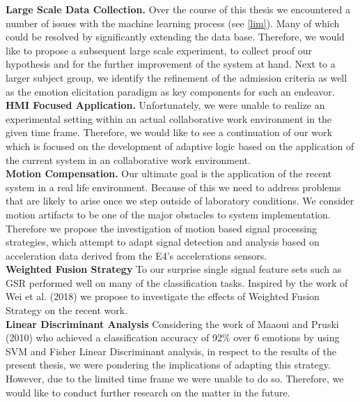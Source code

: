 \textbf{Large Scale Data Collection.}
Over the course of this thesis we encountered a number of issues with the machine learning process (see \ref{lim}). Many of which could be resolved by significantly extending the data base. Therefore, we would like to propose a subsequent large scale experiment, to collect proof our hypothesis and for the further improvement of the system at hand. Next to a larger subject group, we identify the refinement of the admission criteria as well as the emotion elicitation paradigm as key components for such an endeavor.\\[10pt]
\textbf{HMI Focused Application.}
Unfortunately, we were unable to realize an experimental setting within an actual collaborative work environment in the given time frame. Therefore, we would like to see a continuation of our work which is focused on the development of adaptive logic based on the application of the current system in an collaborative work environment.\\[10pt]
\textbf{Motion Compensation.}
Our ultimate goal is the application of the recent system in a real life environment. Because of this we need to address problems that are likely to arise once we step outside of laboratory conditions. We consider motion artifacts to be one of the major obstacles to system implementation. Therefore we propose the investigation of motion based signal processing strategies, which attempt to adapt signal detection and analysis based on acceleration data derived from the E4's accelerations sensors.\\[10pt]
\textbf{Weighted Fusion Strategy}
To our surprise single signal feature sets such as GSR performed well on many of the classification tasks. Inspired by the work of Wei et al. (2018) we propose to investigate the effects of Weighted Fusion Strategy on the recent work.\\[10pt]
\textbf{Linear Discriminant Analysis}
Considering  the work of Maaoui and Pruski (2010) who achieved a classification accuracy of 92\% over 6 emotions by using SVM and Fisher Linear Discriminant analysis, in respect to the results of the present thesis, we were pondering the implications of adapting this strategy. However, due to the limited time frame we were unable to do so. Therefore, we would like to conduct further research on the matter in the future.

